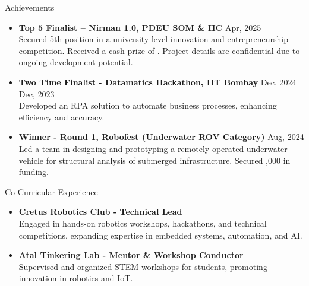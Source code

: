 \documentclass[10pta]{resume} %
\begin{document}
\begin{rSection}{Achievements} 
\begin{itemize}
    \item \textbf{Top 5 Finalist – Nirman 1.0, PDEU SOM \& IIC } \hfill Apr, 2025 \\ Secured 5th position in a university-level innovation and entrepreneurship competition. Received a cash prize of . Project details are confidential due to ongoing development potential.
    \item \textbf{Two Time Finalist - Datamatics Hackathon, IIT Bombay } \hfill Dec, 2024\\ \hspace*{\fill} Dec, 2023 \\ Developed an RPA solution to automate business processes, enhancing efficiency and accuracy.
    \item \textbf{Winner - Round 1, Robofest (Underwater ROV Category)}  \hfill Aug, 2024 \\ Led a team in designing and prototyping a remotely operated underwater vehicle for structural analysis of submerged infrastructure. Secured ,000 in funding.
\end{itemize}
\end{rSection}

\begin{rSection}{Co-Curricular Experience}
\begin{itemize}
    \item \textbf{Cretus Robotics Club - Technical Lead} \\ Engaged in hands-on robotics workshops, hackathons, and technical competitions, expanding expertise in embedded systems, automation, and AI.  
    \item \textbf{Atal Tinkering Lab - Mentor \& Workshop Conductor} \\ Supervised and organized STEM workshops for students, promoting innovation in robotics and IoT.    
\end{itemize}
\end{rSection}
\end{document}
